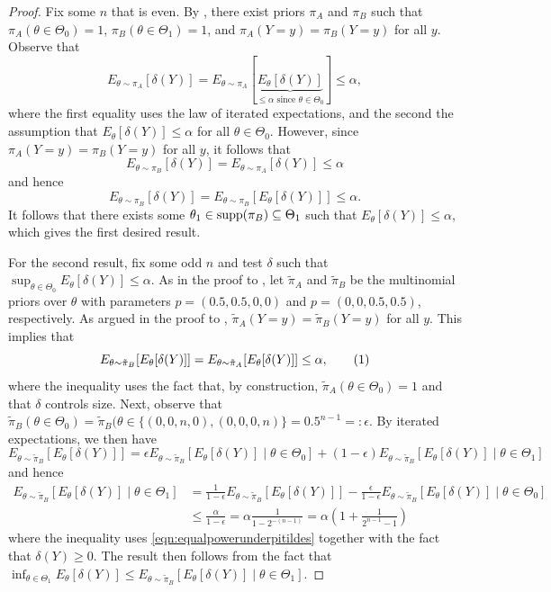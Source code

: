 \documentclass[12pt,reqno]{amsart}
\theoremstyle{theorem}
\theoremstyle{definition}
\newcommand\numberthis{\addtocounter{equation}{1}\tag{\theequation}}
\newcommand{\0}{\mathbf{0}}
\newcommand{\1}{\mathbf{1}}
\begin{document}
\prophasnopower*

\begin{proof}
Fix some $n$ that is even.
By , there exist priors $\pi_A$ and $\pi_B$ such that $\pi_A(\theta \in \Theta_0) = 1$, $\pi_B(\theta \in \Theta_1) = 1$, and $\pi_A(Y =y) = \pi_B(Y =y)$ for all $y$. Observe that
$$E_{\theta \sim \pi_A}[ \delta(Y) ] = E_{\theta \sim \pi_A}[ \underbrace{E_\theta[ \delta(Y) ]}_{\text{$\leq \alpha$ since $\theta \in \Theta_0$}} ] \leq \alpha,$$
\noindent where the first equality uses the law of iterated expectations, and the second the assumption that $E_\theta[\delta(Y)] \leq \alpha$ for all $\theta \in \Theta_0$. However, since $\pi_A(Y =y) = \pi_B(Y =y)$ for all $y$, it follows that 
$$E_{\theta \sim \pi_B}[\delta(Y)] = E_{\theta \sim \pi_A}[\delta(Y)] \leq \alpha$$
and hence
$$E_{\theta \sim \pi_B}[\delta(Y)] = E_{\theta \sim \pi_B}[ E_\theta[\delta(Y)] ] \leq \alpha.$$
\noindent It follows that there exists some $\theta_1 \in \operatorname{supp}(\pi_B) \subseteq \Theta_1$ such that $E_{\theta}[\delta(Y)] \leq \alpha$, which gives the first desired result. 

For the second result, fix some odd $n$ and test $\delta$ such that $\sup_{\theta \in \Theta_0} E_{\theta}[\delta(Y)] \leq \alpha$. As in the proof to , let $\tilde\pi_A$ and $\tilde\pi_B$ be the multinomial priors over $\theta$ with parameters $p=(0.5,0.5,0,0)$ and $p=(0,0,0.5,0.5)$, respectively. As argued in the proof to , $\tilde{\pi}_A(Y{=}y) = \tilde{\pi}_B(Y{=}y)$ for all $y$. This implies that
\[E_{\theta \sim \tilde{\pi}_B}[ E_{\theta}[\delta(Y)] ] = E_{\theta \sim \tilde{\pi}_A}[ E_{\theta}[\delta(Y)] ] \leq \alpha, \numberthis \label{eqn:equalpowerunderpitildes} \]
where the inequality uses the fact that, by construction, $\tilde{\pi}_A(\theta \in \Theta_0) = 1$ and that $\delta$ controls size. Next, observe that $\tilde\pi_B(\theta \in \Theta_0) = \tilde\pi_B( \theta \in \{(0,0,n,0),(0,0,0,n)\} = 0.5^{n-1} =: \epsilon$. By iterated expectations, we then have
\[ E_{\theta \sim \tilde{\pi}_B}[ E_{\theta}[\delta(Y)] ] = \epsilon E_{\theta \sim \tilde{\pi}_B}[ E_{\theta}[\delta(Y)] \mid \theta \in \Theta_0 ] + (1-\epsilon) E_{\theta \sim \tilde{\pi}_B}[ E_{\theta}[\delta(Y)] \mid \theta \in \Theta_1 ]  \]
and hence 
\begin{align*}
   E_{\theta \sim \tilde{\pi}_B}[ E_{\theta}[\delta(Y)] \mid \theta \in \Theta_1 ] &= \frac{1}{1-\epsilon} E_{\theta \sim \tilde{\pi}_B}[ E_{\theta}[\delta(Y)] ] - \frac{\epsilon}{1-\epsilon} E_{\theta \sim \tilde{\pi}_B}[ E_{\theta}[\delta(Y)] \mid \theta \in \Theta_0 ] \\
   &\leq \frac{\alpha}{1-\epsilon} = \alpha \frac{1}{1 - 2^{-(n-1)}} = \alpha \left(1 + \frac{1}{2^{n-1}-1} \right)
\end{align*}
where the inequality uses \eqref{eqn:equalpowerunderpitildes} together with the fact that $\delta(Y) \geq 0$. The result then follows from the fact that $\inf_{\theta \in \Theta_1} E_{\theta}[\delta(Y)] \leq E_{\theta \sim \tilde{\pi}_B}[ E_{\theta}[\delta(Y)] \mid \theta \in \Theta_1 ]$.
 \end{proof}
\end{document}

